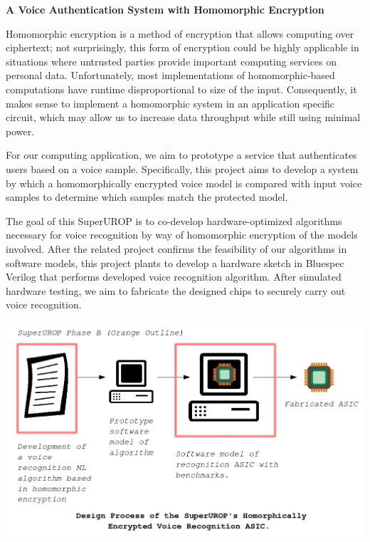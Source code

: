 \documentclass[11pt]{article}
\begin{document}
\textbf{A Voice Authentication System with Homomorphic Encryption}

Homomorphic encryption is a method of encryption that allows computing over ciphertext; not surprisingly, this form of encryption could be highly applicable in situations where untrusted parties provide important computing services on personal data. Unfortunately, most implementations of homomorphic-based computations have runtime disproportional to size of the input. Consequently, it makes sense to implement a homomorphic system in an application specific circuit, which may allow us to increase data throughput while still using minimal power.

For our computing application, we aim to prototype a service that authenticates users based on a voice sample. Specifically, this project aims to develop a system by which a homomorphically encrypted voice model is compared with input voice samples to determine which samples match the protected model.

The goal of this SuperUROP is to co-develop hardware-optimized algorithms necessary for voice recognition by way of homomorphic encryption of the models involved. After the related project confirms the feasibility of our algorithms in software models, this project plants to develop a hardware sketch in Bluespec Verilog that performs developed voice recognition algorithm. After simulated hardware testing, we aim to fabricate the designed chips to securely carry out voice recognition.

\includegraphics[scale=0.5]{skoppula-picture-2.jpg}
\end{document}
